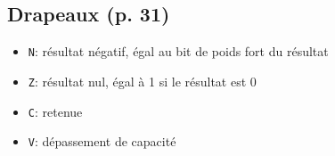 \documentclass{article}
\begin{document}
    \subsection{Drapeaux (p. 31)}
    \label{subsec:Flags}

    \begin{itemize}
        \item \texttt{N}: résultat négatif, égal au bit de poids fort du résultat
        \item \texttt{Z}: résultat nul, égal à 1 si le résultat est 0
        \item \texttt{C}: retenue
        \item \texttt{V}: dépassement de capacité
    \end{itemize}
\end{document}
